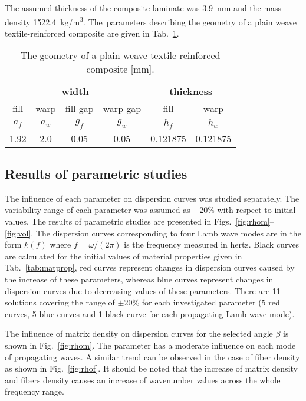 \documentclass[]{spie}  %
\begin{document}
The assumed thickness of the composite laminate was 3.9~mm and the mass density 1522.4~kg/m\textsuperscript{3}. 
The~parameters describing the geometry of a plain weave textile-reinforced composite 
are given in Tab.~\ref{tab:weave_geo}. 
\begin{table}[ht]
	\renewcommand{\arraystretch}{1.3}
	\caption{The geometry of a plain weave textile-reinforced composite [mm].}
	\label{tab:weave_geo}
	\begin{center}
		\begin{tabular}{cccccc} 
			\toprule
			\multicolumn{4}{c}{\textbf{width} }	& \multicolumn{2}{c}{\textbf{thickness} }  \\ 
			\cmidrule(lr){1-4} \cmidrule(lr){5-6} 
			fill & warp & fill gap& warp gap& fill & warp\\
			\(a_f\) &\(a_w\)& \(g_f\)  & \(g_w\)  & \(h_f\)& \(h_w\) \\ 
			\cmidrule(lr){1-2} \cmidrule(lr){3-4} \cmidrule(lr){5-6}
			1.92 &2.0& 0.05& 0.05 & 0.121875 & 0.121875 \\
			\bottomrule 
		\end{tabular} 
	\end{center}
\end{table}

\cleardoublepage
\subsection{Results of parametric studies}
The influence of each parameter on dispersion curves was studied separately. 
The variability range of each parameter was assumed as \(\pm\)20\% with respect to initial values.
The results of parametric studies are presented in Figs.~\ref{fig:rhom}--\ref{fig:vol}.
The dispersion curves corresponding to four Lamb wave modes are in the form \(k(f)\) where \(f=\omega/(2 \pi)\) is the frequency measured in hertz. 
Black curves are calculated for the initial values of material properties given in Tab.~\ref{tab:matprop}, red curves represent changes in dispersion curves caused by the increase of these parameters, whereas blue curves represent changes in dispersion curves due to decreasing values of these parameters. 
There are 11 solutions covering the range of \(\pm\)20\% for each investigated parameter (5 red curves, 5 blue curves and 1 black curve for each propagating Lamb wave mode).

The influence of matrix density on dispersion curves for the selected angle \(\beta\) is shown in Fig.~\ref{fig:rhom}. 
The parameter has a moderate influence on each mode of propagating waves.
A similar trend can be observed in the case of fiber density as shown in Fig.~\ref{fig:rhof}.
It should be noted that the increase of matrix density and fibers density causes an increase of wavenumber values across the whole frequency range.
\end{document}
